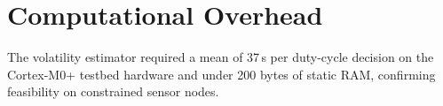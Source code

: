 \section{Computational Overhead}
The volatility estimator required a mean of 37\,\textmu s per duty-cycle decision on the
Cortex-M0+ testbed hardware and under 200 bytes of static RAM, confirming feasibility on
constrained sensor nodes.
